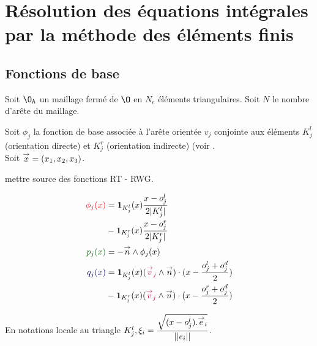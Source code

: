 \section{Résolution des équations intégrales par la méthode des éléments finis}
  \subsection{Fonctions de base}
    Soit \(\O_h\) un maillage fermé de \(\O\) en \(N_e\) éléments triangulaires. Soit \(N\) le nombre d'arête du maillage.

    Soit \(\phi_j\) la fonction de base associée à l’arête orientée \(v_j\) conjointe aux éléments  \(K_j^l\) (orientation directe) et \(K_j^r\) (orientation indirecte) (voir \cite{nedelec_acoustic_2001}.\\

    Soit \(\vx = (x_1,x_2,x_3)\).

    \begin{TODO}
      mettre source des fonctions RT - RWG.
    \end{TODO}


    \begin{minipage}{0.58\textwidth}
      \centering
      \begin{tikzpicture}[scale=2.5]
        
      \end{tikzpicture}
    \end{minipage} 
    \begin{minipage}{0.4\textwidth}
      \begin{align*}
        \color{red}{\phi_j(x)} &= \mathbf{1}_{K_j^l}(x)\frac{x-o_j^l}{2|K_j^l|} \\&- \mathbf{1}_{K_j^r}(x)\frac{x-o_j^r}{2|K_j^r|}\\
        \color{black!60!green}{p_j(x)} &= -\vn \pvect \phi_j(x)\\
        \color{black!60!blue}{q_j(x)} &= \mathbf{1}_{K_j^l}(x) ( { \color{purple}{\vect{v}_j } } \pvect \vn ) \cdot ( x - \frac{o^l_j + o^d_j}{2} ) \\
        &- \mathbf{1}_{K_j^r}(x) ( { \color{purple}{\vect{v}_j } } \pvect \vn ) \cdot ( x - \frac{o^r_j + o^d_j}{2} )
      \end{align*}
    \end{minipage}

    En notations locale au triangle \(K_j^l, \xi_i = \frac{\sqrt{(x-o^l_j).\vect e_i}}{||e_i||}\).

